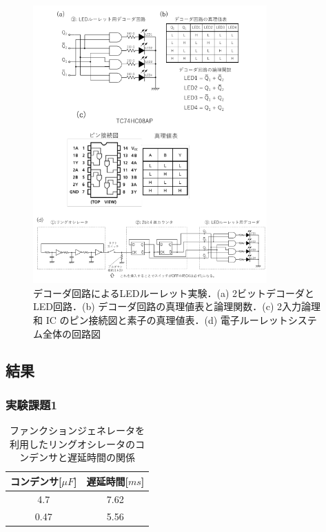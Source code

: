 \documentclass{ltjsarticle}
\begin{document}
\begin{figure}[H]
  \centering
  \includegraphics[width=0.8\textwidth]{figs/DecorderProcedure.png}
  \caption{デコーダ回路によるLEDルーレット実験．(a) 2ビットデコーダとLED回路．(b) デコーダ回路の真理値表と論理関数．(c) 2入力論理和 IC のピン接続図と素子の真理値表．(d) 電子ルーレットシステム全体の回路図}
  \label{fig:LED}
\end{figure}

\subsection{結果}
\subsubsection{実験課題1}
\begin{table}[H]
\centering
\begin{tabular}{|c|c|}
\hline
コンデンサ[${\mu F}$] & 遅延時間[${ms}$] \\ \hline
4.7 & 7.62  \\ \hline
0.47 & 5.56 \\ \hline
\end{tabular}
\caption{ファンクションジェネレータを利用したリングオシレータのコンデンサと遅延時間の関係}
\label{tab:results_1}
\end{table}
\end{document}
